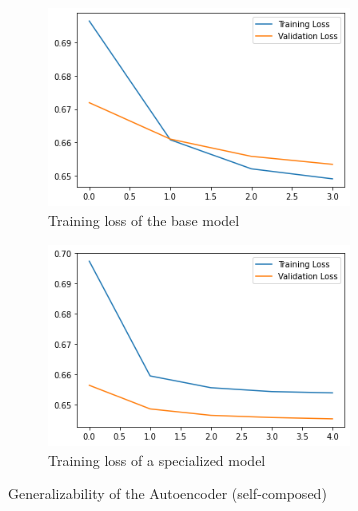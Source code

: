 \begin{figure}[H]
    \centering
    \begin{subfigure}[bH]{0.49\textwidth}
        \centering
        \includegraphics[width=8cm]{assets/testing/loss-base-model.png}
        \caption{Training loss of the base model}
    \end{subfigure}
    \hfill
    \begin{subfigure}[bH]{0.49\textwidth}
        \centering
        \includegraphics[width=8cm]{assets/testing/loss-service-2.png}
        \caption{Training loss of a specialized model}
    \end{subfigure}
    \hfill
    \caption{Generalizability of the Autoencoder (self-composed)}
\end{figure}